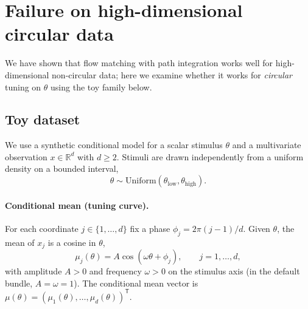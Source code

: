 \section{Failure on high-dimensional circular data}

We have shown that flow matching with path integration works well for high-dimensional non-circular data; here we examine whether it works for \emph{circular} tuning on $\theta$ using the toy family below.

\subsection{Toy dataset}

We use a synthetic conditional model for a scalar stimulus $\theta$ and a multivariate observation $x \in \mathbb{R}^{d}$ with $d \ge 2$.
Stimuli are drawn independently from a uniform density on a bounded interval,
\begin{equation}
  \theta \sim \mathrm{Uniform}(\theta_{\mathrm{low}}, \theta_{\mathrm{high}}).
\end{equation}

\paragraph{Conditional mean (tuning curve).}
For each coordinate $j \in \{1,\ldots,d\}$ fix a phase $\phi_j = 2\pi(j-1)/d$.
Given $\theta$, the mean of $x_j$ is a cosine in $\theta$,
\begin{equation}
  \mu_j(\theta) = A \cos(\omega \theta + \phi_j),
  \qquad j = 1,\ldots,d,
\end{equation}
with amplitude $A > 0$ and frequency $\omega > 0$ on the stimulus axis (in the default bundle, $A=\omega=1$).
The conditional mean vector is $\mu(\theta) = (\mu_1(\theta),\ldots,\mu_d(\theta))^{\mathsf{T}}$.

